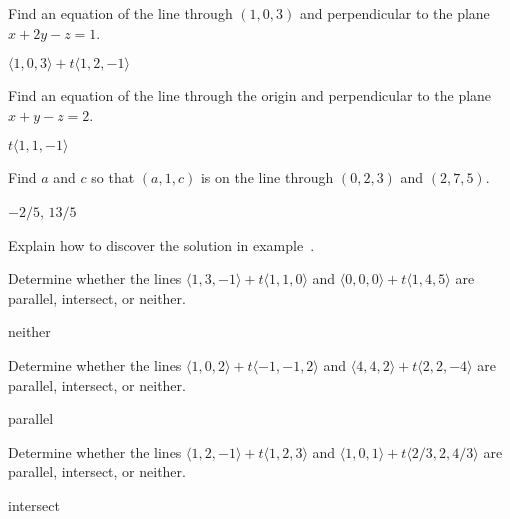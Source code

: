 \begin{exercises}
\begin{exercise} Find an equation of the line through $(1,0,3)$ and 
perpendicular to the plane $x+2y-z=1$.
\begin{answer} $\langle 1,0,3\rangle+t\langle 1,2,-1\rangle$
\end{answer}\end{exercise}

\begin{exercise} Find an equation of the line through the origin
and perpendicular to the plane $x+y-z=2$.
\begin{answer} $t\langle 1,1,-1\rangle$
\end{answer}\end{exercise}

\begin{exercise} Find $a$ and $c$ so that $(a,1,c)$ is on the line through
$(0,2,3)$ and $(2,7,5)$.
\begin{answer} $-2/5$, $13/5$
\end{answer}\end{exercise}

\begin{exercise} Explain how to discover the solution in
example~.

\begin{exercise} Determine whether the lines $\langle 1,3,-1\rangle+t\langle
1,1,0\rangle$ and $\langle 0,0,0\rangle+t\langle 1,4,5\rangle$ are
parallel, intersect, or neither.
\begin{answer} neither
\end{answer}\end{exercise}

\begin{exercise} Determine whether the lines $\langle 1,0,2\rangle+t\langle
-1,-1,2\rangle$ and $\langle 4,4,2\rangle+t\langle 2,2,-4\rangle$ are
parallel, intersect, or neither.
\begin{answer} parallel
\end{answer}\end{exercise}

\begin{exercise} Determine whether the lines $\langle 1,2,-1\rangle+t\langle
1,2,3\rangle$ and $\langle 1,0,1\rangle+t\langle 2/3,2,4/3\rangle$ are
parallel, intersect, or neither.
\begin{answer} intersect
\end{answer}\end{exercise}


\end{exercise}
\end{exercises}
